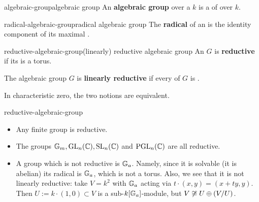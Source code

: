 \begin{topic}{algebraic-group}{algebraic group}
    An \textbf{algebraic group} over a  $k$ is a  of  over $k$.
\end{topic}


\begin{topic}{radical-algebraic-group}{radical algebraic group}
    The \textbf{radical} of an  is the identity component of its maximal   .
\end{topic}

\begin{topic}{reductive-algebraic-group}{(linearly) reductive algebraic group}
    An  $G$ is \textbf{reductive} if its  is a torus.
    
    The algebraic group $G$ is \textbf{linearly reductive} if every  of $G$ is .
    
    In characteristic zero, the two notions are equivalent.
\end{topic}

\begin{example}{reductive-algebraic-group}
    \begin{itemize}
        \item Any finite group is reductive.
        \item The groups $\mathbb{G}_m, \textup{GL}_n(\mathbb{C}), \textup{SL}_n(\mathbb{C})$ and $\textup{PGL}_n(\mathbb{C})$ are all reductive. 
        \item A group which is not reductive is $\mathbb{G}_a$. Namely, since it is solvable (it is abelian) its radical is $\mathbb{G}_a$, which is not a torus. Also, we see that it is not linearly reductive: take $V = k^2$ with $\mathbb{G}_a$ acting via $t \cdot (x, y) = (x + ty, y)$. Then $U := k \cdot (1, 0) \subset V$ is a sub-$k[\mathbb{G}_a]$-module, but $V \not\cong U \oplus (V / U)$.
    \end{itemize}
\end{example}

